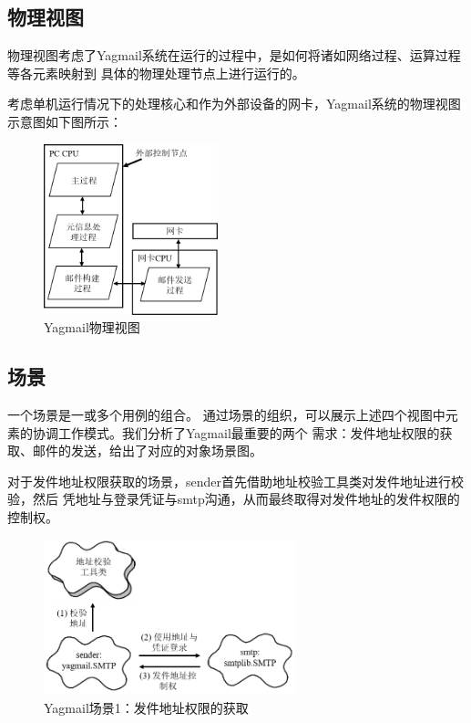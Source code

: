 \documentclass[UTF8,12pt,a4paper]{ctexart}
\begin{document}
\subsection{物理视图}

    物理视图考虑了Yagmail系统在运行的过程中，是如何将诸如网络过程、运算过程等各元素映射到
    具体的物理处理节点上进行运行的。
    
    考虑单机运行情况下的处理核心和作为外部设备的网卡，Yagmail系统的物理视图示意图如下图所示：
    
    \begin{figure}[H]
        \centering
        \includegraphics[width=0.45\textwidth]{figure/phy-view.png}
        \caption{Yagmail物理视图}
        \label{fig:phy-view}
    \end{figure}

\subsection{场景}

    一个场景是一或多个用例的组合。
    通过场景的组织，可以展示上述四个视图中元素的协调工作模式。我们分析了Yagmail最重要的两个
    需求：发件地址权限的获取、邮件的发送，给出了对应的对象场景图。
    
    对于发件地址权限获取的场景，sender首先借助地址校验工具类对发件地址进行校验，然后
    凭地址与登录凭证与smtp沟通，从而最终取得对发件地址的发件权限的控制权。
    \begin{figure}[H]
        \centering
        \includegraphics[width=0.65\textwidth]{figure/scene-1.png}
        \caption{Yagmail场景1：发件地址权限的获取}
        \label{fig:scene-1}
    \end{figure}
    
\end{document}
